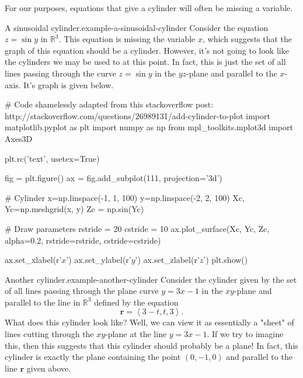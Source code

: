 \documentclass[10pt,]{book}
\numberwithin{equation}{section}
\newcommand{\RR}{\mathbb{R}}
\newcommand{\vv}[1]{\mathbf{#1}}
\newcommand{\dotprod}[1]{\left\langle #1 \right\rangle}
\begin{document}
For our purposes, equations that give a cylinder will often be missing a variable.%
\begin{example}{A sinusoidal cylinder.}{example-a-sinusoidal-cylinder}%
\hypertarget{p-1238}{}%
Consider the equation \(z = \sin y\) in \(\RR^{3}\). This equation is missing the variable \(x\), which suggests that the graph of this equation should be a cylinder. However, it's not going to look like the cylinders we may be used to at this point. In fact, this is just the set of all lines passing through the curve \(z=\sin y\) in the \(yz\)-plane and parallel to the \(x\)-axis. It's graph is given below.%
\end{example}
\begin{sageinput}
# Code shamelessly adapted from this stackoverflow post: http://stackoverflow.com/questions/26989131/add-cylinder-to-plot
import matplotlib.pyplot as plt
import numpy as np
from mpl_toolkits.mplot3d import Axes3D

plt.rc('text', usetex=True)

fig = plt.figure()
ax = fig.add_subplot(111, projection='3d')

# Cylinder
x=np.linspace(-1, 1, 100)
y=np.linspace(-2, 2, 100)
Xc, Yc=np.meshgrid(x, y)
Zc = np.sin(Yc)

# Draw parameters
rstride = 20
cstride = 10
ax.plot_surface(Xc, Yc, Zc, alpha=0.2, rstride=rstride, cstride=cstride)

ax.set_xlabel(r'$x$')
ax.set_ylabel(r'$y$')
ax.set_zlabel(r'$z$')
plt.show()
\end{sageinput}
\begin{example}{Another cylinder.}{example-another-cylinder}%
\hypertarget{p-1239}{}%
Consider the cylinder given by the set of all lines passing through the plane curve \(y = 3x-1\) in the \(xy\)-plane and parallel to the line in \(\RR^{3}\) defined by the equation%
%
\begin{equation*}
\vv{r} = \dotprod{3-t,t,3}.
\end{equation*}
\hypertarget{p-1240}{}%
What does this cylinder look like? Well, we can view it as essentially a "sheet" of lines cutting through the \(xy\)-plane at the line \(y = 3x-1\). If we try to imagine this, then this suggests that this cylinder should probably be a plane! In fact, this cylinder is exactly the plane containing the point \((0,-1,0)\) and parallel to the line \(\vv{r}\) given above.%
\end{example}
%
%
\typeout{************************************************}
\typeout{************************************************}
%
\end{document}
